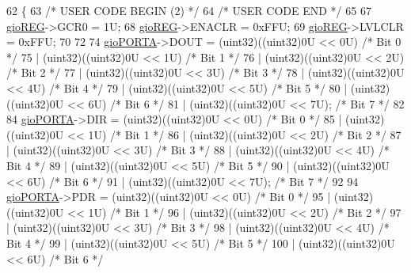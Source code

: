 \begin{DoxyCode}
62 \{
63 \textcolor{comment}{/* USER CODE BEGIN (2) */}
64 \textcolor{comment}{/* USER CODE END */}
65 
67     \mbox{\hyperlink{reg__gio_8h_acf3fc7487b247fa20e47f99b3551b8dd}{gioREG}}->GCR0   = 1U;
68     \mbox{\hyperlink{reg__gio_8h_acf3fc7487b247fa20e47f99b3551b8dd}{gioREG}}->ENACLR = 0xFFU;
69     \mbox{\hyperlink{reg__gio_8h_acf3fc7487b247fa20e47f99b3551b8dd}{gioREG}}->LVLCLR = 0xFFU;
70 
72 
74     \mbox{\hyperlink{reg__gio_8h_ae20775a37d510c0bd217a9f75c90a574}{gioPORTA}}->DOUT = (uint32)((uint32)0U << 0U)  \textcolor{comment}{/* Bit 0 */}
75                    | (uint32)((uint32)0U << 1U)  \textcolor{comment}{/* Bit 1 */}
76                    | (uint32)((uint32)0U << 2U)  \textcolor{comment}{/* Bit 2 */}
77                    | (uint32)((uint32)0U << 3U)  \textcolor{comment}{/* Bit 3 */}
78                    | (uint32)((uint32)0U << 4U)  \textcolor{comment}{/* Bit 4 */}
79                    | (uint32)((uint32)0U << 5U)  \textcolor{comment}{/* Bit 5 */}
80                    | (uint32)((uint32)0U << 6U)  \textcolor{comment}{/* Bit 6 */}
81                    | (uint32)((uint32)0U << 7U); \textcolor{comment}{/* Bit 7 */}
82 
84     \mbox{\hyperlink{reg__gio_8h_ae20775a37d510c0bd217a9f75c90a574}{gioPORTA}}->DIR  = (uint32)((uint32)0U << 0U)  \textcolor{comment}{/* Bit 0 */}
85                    | (uint32)((uint32)0U << 1U)  \textcolor{comment}{/* Bit 1 */}
86                    | (uint32)((uint32)0U << 2U)  \textcolor{comment}{/* Bit 2 */}
87                    | (uint32)((uint32)0U << 3U)  \textcolor{comment}{/* Bit 3 */}
88                    | (uint32)((uint32)0U << 4U)  \textcolor{comment}{/* Bit 4 */}
89                    | (uint32)((uint32)0U << 5U)  \textcolor{comment}{/* Bit 5 */}
90                    | (uint32)((uint32)0U << 6U)  \textcolor{comment}{/* Bit 6 */}
91                    | (uint32)((uint32)0U << 7U); \textcolor{comment}{/* Bit 7 */}
92 
94     \mbox{\hyperlink{reg__gio_8h_ae20775a37d510c0bd217a9f75c90a574}{gioPORTA}}->PDR  = (uint32)((uint32)0U << 0U)  \textcolor{comment}{/* Bit 0 */}
95                    | (uint32)((uint32)0U << 1U)  \textcolor{comment}{/* Bit 1 */}
96                    | (uint32)((uint32)0U << 2U)  \textcolor{comment}{/* Bit 2 */}
97                    | (uint32)((uint32)0U << 3U)  \textcolor{comment}{/* Bit 3 */}
98                    | (uint32)((uint32)0U << 4U)  \textcolor{comment}{/* Bit 4 */}
99                    | (uint32)((uint32)0U << 5U)  \textcolor{comment}{/* Bit 5 */}
100                    | (uint32)((uint32)0U << 6U)  \textcolor{comment}{/* Bit 6 */}

\end{DoxyCode}
